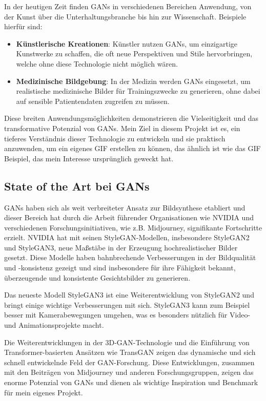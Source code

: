 \documentclass[a4paper, 12pt]{article}
\begin{document}
In der heutigen Zeit finden GANs in verschiedenen Bereichen Anwendung, von der Kunst über die Unterhaltungsbranche bis hin zur Wissenschaft. Beispiele hierfür sind:
\begin{itemize}
  \item \textbf{Künstlerische Kreationen}: Künstler nutzen GANs, um einzigartige Kunstwerke zu schaffen, die oft neue Perspektiven und Stile hervorbringen, welche ohne diese Technologie nicht möglich wären.\cite{kunstloft_article}
  \item \textbf{Medizinische Bildgebung}: In der Medizin werden GANs eingesetzt, um realistische medizinische Bilder für Trainingszwecke zu generieren, ohne dabei auf sensible Patientendaten zugreifen zu müssen. \cite{avinci_ai_gans}
\end{itemize}


Diese breiten Anwendungsmöglichkeiten demonstrieren die Vielseitigkeit und das transformative Potenzial von GANs. Mein Ziel in diesem Projekt ist es, ein tieferes Verständnis dieser Technologie zu entwickeln und sie praktisch anzuwenden, um ein eigenes GIF erstellen zu können, das ähnlich ist wie das GIF Beispiel, das mein Interesse ursprünglich geweckt hat.

\subsection{State of the Art bei GANs}
GANs haben sich als weit verbreiteter Ansatz zur Bildsynthese etabliert und dieser Bereich hat durch die Arbeit führender Organisationen wie NVIDIA und verschiedenen Forschungsinitiativen, wie z.B. Midjourney, signifikante Fortschritte erzielt. NVIDIA hat mit seinen StyleGAN-Modellen, insbesondere StyleGAN2 und StyleGAN3, neue Maßstäbe in der Erzeugung hochrealistischer Bilder gesetzt\cite{StyleGAN3, StyleGAN3_Github, StyleGAN2}. Diese Modelle haben bahnbrechende Verbesserungen in der Bildqualität und -konsistenz gezeigt und sind insbesondere für ihre Fähigkeit bekannt, überzeugende und konsistente Gesichtsbilder zu generieren\cite{StyleGAN3, StyleGAN3_Github}.

Das neueste Modell StyleGAN3 ist eine Weiterentwicklung von StyleGAN2 und bringt einige wichtige Verbesserungen mit sich. StyleGAN3 kann zum Beispiel besser mit Kamerabewegungen umgehen, was es besonders nützlich für Video- und Animationsprojekte macht\cite{StyleGAN3_next}.

Die Weiterentwicklungen in der 3D-GAN-Technologie und die Einführung von Transformer-basierten Ansätzen wie TransGAN zeigen das dynamische und sich schnell entwickelnde Feld der GAN-Forschung\cite{jiang2021transgan}. Diese Entwicklungen, zusammen mit den Beiträgen von Midjourney und anderen Forschungsgruppen, zeigen das enorme Potenzial von GANs und dienen als wichtige Inspiration und Benchmark für mein eigenes Projekt.
\end{document}
